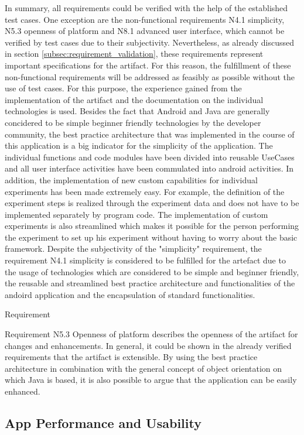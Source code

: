 In summary, all requirements could be verified with the help of the established test cases. One exception are the non-functional requirements N4.1 simplicity, N5.3 openness of platform and N8.1 advanced user interface, which cannot be verified by test cases due to their subjectivity. Nevertheless, as already discussed in section \ref{subsec:requirement_validation}, these requirements represent important specifications for the artifact. For this reason, the fulfillment of these non-functional requirements will be addressed as feasibly as possible without the use of test cases. For this purpose, the experience gained from the implementation of the artifact and the documentation on the individual technologies is used. Besides the fact that Android and Java are generally concidered to be simple beginner friendly technologies by the developer community, the best practice architecture that was implemented in the course of this application is a big indicator for the simplicity of the application. The individual functions and code modules have been divided into reusable UseCases and all user interface activities have been commulated into android activities. In addition, the implementation of new custom capabilities for individual experiments has been made extremely easy. For example, the definition of the experiment steps is realized through the experiment data and does not have to be implemented separately by program code. The implementation of custom experiments is also streamlined which makes it possible for the person performing the experiment to set up his experiment without having to worry about the basic framework. Despite the subjectivity of the "simplicity" requirement, the requirement N4.1 simplicity is considered to be fulfilled for the artefact due to the usage of technologies which are considered to be simple and beginner friendly, the reusable and streamlined best practice architecture and functionalities of the andoird application and the encapsulation of standard functionalities. 

Requirement

Requirement N5.3 Openness of platform describes the openness of the artifact for changes and enhancements. In general, it could be shown in the already verified requirements that the artifact is extensible. By using the best practice architecture in combination with the general concept of object orientation on which Java is based, it is also possible to argue that the application can be easily enhanced.








\subsection{App Performance and Usability}
